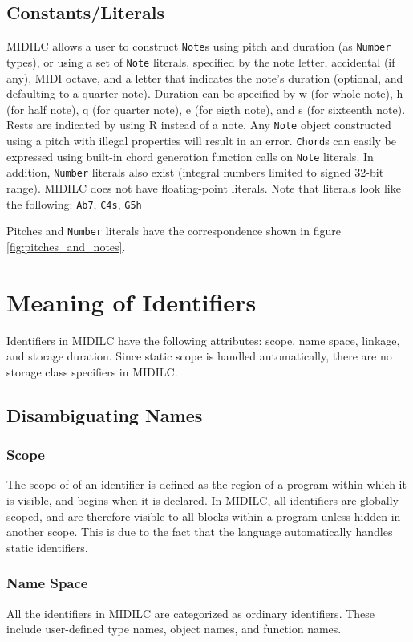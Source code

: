 \documentclass[12pt,A4]{book}
\begin{document}
\subsection{Constants/Literals}
MIDILC allows a user to construct \verb|Note|s using pitch and duration (as \verb|Number| types), or using a set of \verb|Note| literals, specified by the note letter, accidental (if any), MIDI octave, and a letter that indicates the note’s duration (optional, and defaulting to a quarter note).  Duration can be specified by w (for whole note), h (for half note), q (for quarter note), e (for eigth note), and s (for sixteenth note).  Rests are indicated by using R instead of a note. Any \verb|Note| object constructed using a pitch with illegal properties will result in an error. \verb|Chord|s can easily be expressed using built-in chord generation function calls on \verb|Note| literals.  In addition, \verb|Number| literals also exist (integral numbers limited to signed 32-bit range).  MIDILC does not have floating-point literals.
Note that literals look like the following:
\verb|Ab7|,
\verb|C4s|,
\verb|G5h|

Pitches and \verb|Number| literals have the correspondence shown in figure \ref{fig:pitches_and_notes}.

\section{Meaning of Identifiers}
Identifiers in MIDILC have the following attributes: scope, name space, linkage, and storage duration. Since static scope is handled automatically, there are no storage class specifiers in MIDILC.
\subsection{Disambiguating Names}
\subsubsection{Scope}
The scope of of an identifier is defined as the region of a program within which it is visible, and begins when it is declared. In MIDILC, all identifiers are globally scoped, and are therefore visible to all blocks within a program unless hidden in another scope. This is due to the fact that the language automatically handles static identifiers.
\subsubsection{Name Space}
All the identifiers in MIDILC are categorized as ordinary identifiers. These include user-defined type names, object names, and function names.
\end{document}
